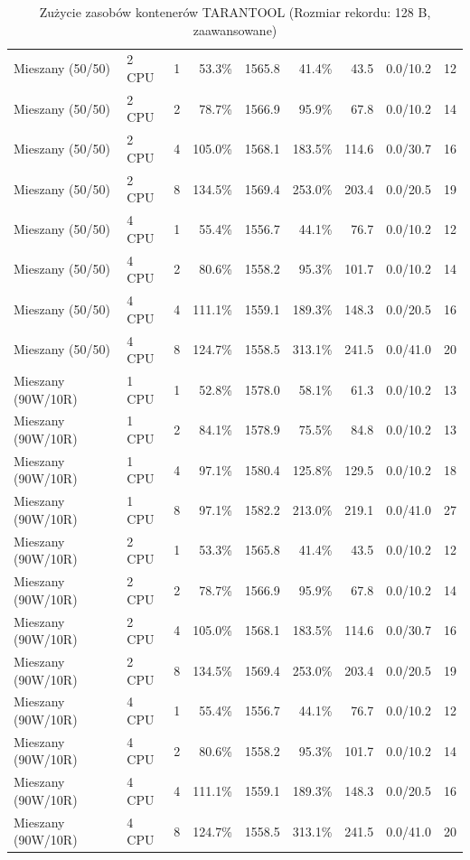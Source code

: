 \begin{table}[ht]
{\begin{tabular}{llcrrrrcc}
Mieszany (50/50) & 2 CPU & 1 & 53.3\% & 1565.8 & 41.4\% & 43.5 & 0.0/10.2 & 12 \\
Mieszany (50/50) & 2 CPU & 2 & 78.7\% & 1566.9 & 95.9\% & 67.8 & 0.0/10.2 & 14 \\
Mieszany (50/50) & 2 CPU & 4 & 105.0\% & 1568.1 & 183.5\% & 114.6 & 0.0/30.7 & 16 \\
Mieszany (50/50) & 2 CPU & 8 & 134.5\% & 1569.4 & 253.0\% & 203.4 & 0.0/20.5 & 19 \\
Mieszany (50/50) & 4 CPU & 1 & 55.4\% & 1556.7 & 44.1\% & 76.7 & 0.0/10.2 & 12 \\
Mieszany (50/50) & 4 CPU & 2 & 80.6\% & 1558.2 & 95.3\% & 101.7 & 0.0/10.2 & 14 \\
Mieszany (50/50) & 4 CPU & 4 & 111.1\% & 1559.1 & 189.3\% & 148.3 & 0.0/20.5 & 16 \\
Mieszany (50/50) & 4 CPU & 8 & 124.7\% & 1558.5 & 313.1\% & 241.5 & 0.0/41.0 & 20 \\
Mieszany (90W/10R) & 1 CPU & 1 & 52.8\% & 1578.0 & 58.1\% & 61.3 & 0.0/10.2 & 13 \\
Mieszany (90W/10R) & 1 CPU & 2 & 84.1\% & 1578.9 & 75.5\% & 84.8 & 0.0/10.2 & 13 \\
Mieszany (90W/10R) & 1 CPU & 4 & 97.1\% & 1580.4 & 125.8\% & 129.5 & 0.0/10.2 & 18 \\
Mieszany (90W/10R) & 1 CPU & 8 & 97.1\% & 1582.2 & 213.0\% & 219.1 & 0.0/41.0 & 27 \\
Mieszany (90W/10R) & 2 CPU & 1 & 53.3\% & 1565.8 & 41.4\% & 43.5 & 0.0/10.2 & 12 \\
Mieszany (90W/10R) & 2 CPU & 2 & 78.7\% & 1566.9 & 95.9\% & 67.8 & 0.0/10.2 & 14 \\
Mieszany (90W/10R) & 2 CPU & 4 & 105.0\% & 1568.1 & 183.5\% & 114.6 & 0.0/30.7 & 16 \\
Mieszany (90W/10R) & 2 CPU & 8 & 134.5\% & 1569.4 & 253.0\% & 203.4 & 0.0/20.5 & 19 \\
Mieszany (90W/10R) & 4 CPU & 1 & 55.4\% & 1556.7 & 44.1\% & 76.7 & 0.0/10.2 & 12 \\
Mieszany (90W/10R) & 4 CPU & 2 & 80.6\% & 1558.2 & 95.3\% & 101.7 & 0.0/10.2 & 14 \\
Mieszany (90W/10R) & 4 CPU & 4 & 111.1\% & 1559.1 & 189.3\% & 148.3 & 0.0/20.5 & 16 \\
Mieszany (90W/10R) & 4 CPU & 8 & 124.7\% & 1558.5 & 313.1\% & 241.5 & 0.0/41.0 & 20 \\
\bottomrule
\end{tabular}%
}
\caption{Zużycie zasobów kontenerów TARANTOOL (Rozmiar rekordu: 128 B, zaawansowane)}
\label{tab:resources_tarantool_small_0}
\end{table}
